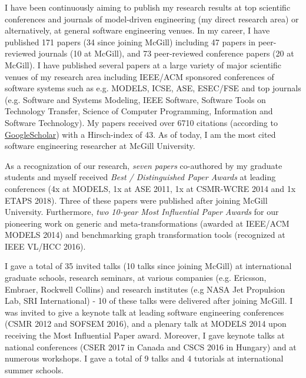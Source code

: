 I have been continuously aiming to publish my research results at top scientific conferences and journals of model-driven engineering (my direct research area) or alternatively, at general software engineering venues. In my career, I have published 171 papers (34 since joining McGill) including 47 papers in peer-reviewed journals (10 at McGill), and 73 peer-reviewed conference papers (20 at McGill). I have published several papers at a large variety of major scientific venues of my research area including IEEE/ACM sponsored conferences of software systems such as e.g. MODELS, ICSE, ASE, ESEC/FSE and top journals (e.g. Software and Systems Modeling, IEEE Software, Software Tools on Technology Transfer, Science of Computer Programming, Information and Software Technology). My papers received over 6710 citations (according to \href{https://scholar.google.ca/citations?user=4Ya6dVoAAAAJ&hl=en}{GoogleScholar}) with a Hirsch-index of 43. As of today, I am the most cited software engineering researcher at McGill University.  

As a recognization of our research, \emph{seven papers} co-authored by my graduate students and myself received \emph{Best / Distinguished Paper Awards} at leading conferences (4x at MODELS, 1x at ASE 2011, 1x at CSMR-WCRE 2014 and 1x ETAPS 2018). Three of these papers were published after joining McGill University. Furthermore, \emph{two 10-year Most Influential Paper Awards} for our pioneering work on generic and meta-transformations (awarded at IEEE/ACM MODELS 2014) and benchmarking graph transformation tools (recognized at IEEE VL/HCC 2016).

I gave a total of 35 invited talks (10 talks since joining McGill) at international graduate schools, research seminars, at various companies (e.g. Ericsson, Embraer, Rockwell Collins) and research institutes (e.g NASA Jet Propulsion Lab, SRI International) - 10 of these talks were delivered after joining McGill. I was invited to give a keynote talk at leading software engineering conferences (CSMR 2012 and SOFSEM 2016), and a plenary talk at MODELS 2014 upon receiving the Most Influential Paper award. Moreover, I gave keynote talks at national conferences (CSER 2017 in Canada and CSCS 2016 in Hungary) and at numerous workshops. I gave a total of 9 talks and 4 tutorials at international summer schools.%

